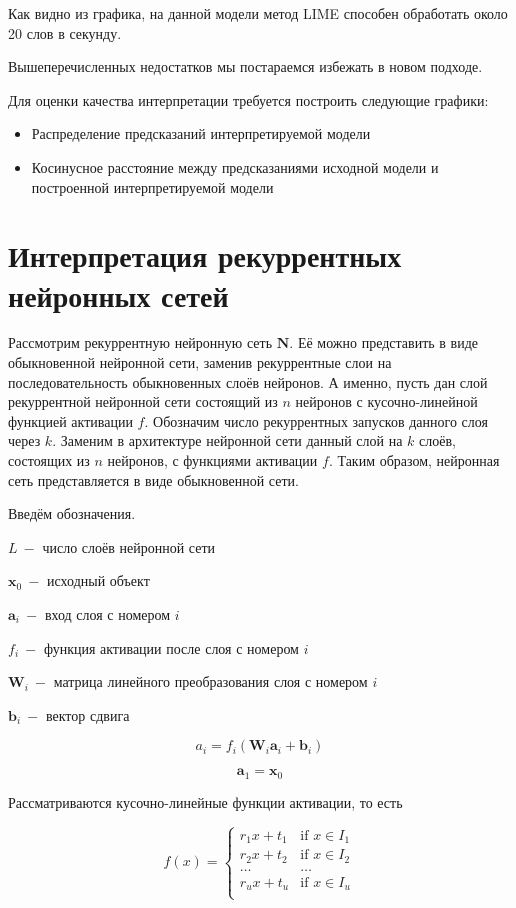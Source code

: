 \documentclass[a4paper, 12pt]{article}
\begin{document}
Как видно из графика, на данной модели метод LIME способен обработать около 20 слов в секунду.

Вышеперечисленных недостатков мы постараемся избежать в новом подходе.

Для оценки качества интерпретации требуется построить следующие графики:
\begin{itemize}
\item Распределение предсказаний интерпретируемой модели

\item Косинусное расстояние между предсказаниями исходной модели и построенной интерпретируемой модели
\end{itemize}

\section{Интерпретация рекуррентных нейронных сетей}

Рассмотрим рекуррентную нейронную сеть $\mathbf{N}$. Её можно представить в виде обыкновенной нейронной сети, заменив рекуррентные слои на последовательность обыкновенных слоёв нейронов. А именно, пусть дан слой рекуррентной нейронной сети состоящий из $n$ нейронов с кусочно-линейной функцией активации $f$. Обозначим число рекуррентных запусков данного слоя через $k$. Заменим в архитектуре нейронной сети данный слой на $k$ слоёв, состоящих из $n$ нейронов, с функциями активации $f$. Таким образом, нейронная сеть представляется в виде обыкновенной сети.

Введём обозначения.

$L~-$ число слоёв нейронной сети

$\mathbf{x}_0~-$ исходный объект

$\mathbf{a}_i~-$ вход слоя с номером $i$

$f_i~-$ функция активации после слоя с номером $i$

$\mathbf{W}_i~-$ матрица линейного преобразования слоя с номером $i$

$\mathbf{b}_i~-$ вектор сдвига

$$a_i=f_i\left(\mathbf{W}_i \mathbf{a}_{i} + \mathbf{b}_i\right)$$

$$\mathbf{a}_1=\mathbf{x}_0$$

Рассматриваются кусочно-линейные функции активации, то есть

\[f(x)=\left\{
\begin{array}{ll}
      r_1 x+t_1 & \text{if } x\in I_1 \\
      r_2 x+t_2 & \text{if } x\in I_2 \\
      \dots&\dots\\
      r_u x+t_u & \text{if } x\in I_u \\
\end{array} 
\right. \]
\end{document}
